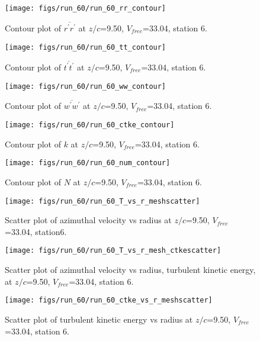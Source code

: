\begin{figure}[H]
\centering
\texttt{[image: figs/run\_60/run\_60\_rr\_contour]}
\caption{Contour plot of $\overline{r^\prime r^\prime}$ at $z/c$=9.50, $V_{free}$=33.04, station 6.}
\label{fig:run_60_rr_contour}
\end{figure}


\begin{figure}[H]
\centering
\texttt{[image: figs/run\_60/run\_60\_tt\_contour]}
\caption{Contour plot of $\overline{t^\prime t^\prime}$ at $z/c$=9.50, $V_{free}$=33.04, station 6.}
\label{fig:run_60_tt_contour}
\end{figure}


\begin{figure}[H]
\centering
\texttt{[image: figs/run\_60/run\_60\_ww\_contour]}
\caption{Contour plot of $\overline{w^\prime w^\prime}$ at $z/c$=9.50, $V_{free}$=33.04, station 6.}
\label{fig:run_60_ww_contour}
\end{figure}


\begin{figure}[H]
\centering
\texttt{[image: figs/run\_60/run\_60\_ctke\_contour]}
\caption{Contour plot of $k$ at $z/c$=9.50, $V_{free}$=33.04, station 6.}
\label{fig:run_60_ctke_contour}
\end{figure}


\begin{figure}[H]
\centering
\texttt{[image: figs/run\_60/run\_60\_num\_contour]}
\caption{Contour plot of $N$ at $z/c$=9.50, $V_{free}$=33.04, station 6.}
\label{fig:run_60_num_contour}
\end{figure}


\begin{figure}[H]
\centering
\texttt{[image: figs/run\_60/run\_60\_T\_vs\_r\_meshscatter]}
\caption{Scatter plot of azimuthal velocity vs radius at $z/c$=9.50, $V_{free}$=33.04, station6.}
\label{fig:run_60_T_vs_r_meshscatter}
\end{figure}


\begin{figure}[H]
\centering
\texttt{[image: figs/run\_60/run\_60\_T\_vs\_r\_mesh\_ctkescatter]}
\caption{Scatter plot of azimuthal velocity vs radius, turbulent kinetic energy, at $z/c$=9.50, $V_{free}$=33.04, station 6.}
\label{fig:run_60_T_vs_r_mesh_ctkescatter}
\end{figure}


\begin{figure}[H]
\centering
\texttt{[image: figs/run\_60/run\_60\_ctke\_vs\_r\_meshscatter]}
\caption{Scatter plot of turbulent kinetic energy vs radius at $z/c$=9.50, $V_{free}$=33.04, station 6.}
\label{fig:run_60_ctke_vs_r_meshscatter}
\end{figure}


